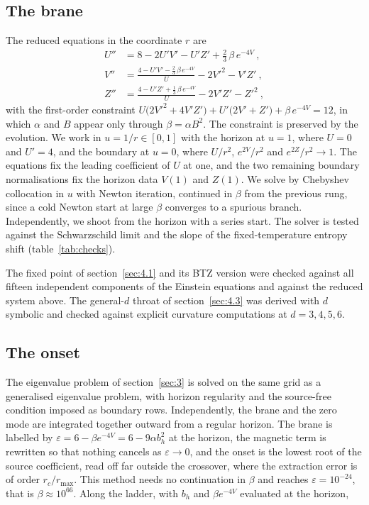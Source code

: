 \subsection{The brane}
\label{app:numerics-brane}

The reduced equations in the coordinate $r$ are
\begin{equation}
\begin{aligned}
U'' &= 8 - 2U'V' - U'Z' + \tfrac23\,\beta\,e^{-4V}~,\\
V'' &= \frac{4 - U'V' - \tfrac23\,\beta\,e^{-4V}}{U} - 2V'^2 - V'Z'~,\\
Z'' &= \frac{4 - U'Z' + \tfrac13\,\beta\,e^{-4V}}{U} - 2V'Z' - Z'^2~,
\end{aligned}
\end{equation}
with the first-order constraint
$U\big(2V'^2 + 4V'Z'\big) + U'\big(2V' + Z'\big) + \beta\,e^{-4V} = 12$, in
which $\alpha$ and $B$ appear only through $\beta = \alpha B^2$. The
constraint is preserved by the evolution. We work in $u = 1/r \in [0, 1]$
with the horizon at $u = 1$, where $U = 0$ and $U' = 4$, and the boundary
at $u = 0$, where $U/r^2$, $e^{2V}/r^2$ and $e^{2Z}/r^2 \to 1$. The equations
fix the leading coefficient of $U$ at one, and the two remaining boundary
normalisations fix the horizon data $V(1)$ and $Z(1)$. We solve by
Chebyshev collocation in $u$ with Newton iteration, continued in $\beta$
from the previous rung, since a cold Newton start at large $\beta$
converges to a spurious branch. Independently, we shoot from the horizon
with a series start. The solver is tested against the Schwarzschild limit
and the slope of the fixed-temperature entropy shift (table~\ref{tab:checks}).

The fixed point of section~\ref{sec:4.1} and its BTZ version were checked
against all fifteen independent components of the Einstein equations and
against the reduced system above. The general-$d$ throat of
section~\ref{sec:4.3} was derived with $d$ symbolic and checked against
explicit curvature computations at $d = 3, 4, 5, 6$.

\subsection{The onset}
\label{app:numerics-onset}

The eigenvalue problem of section~\ref{sec:3} is solved on the same grid as
a generalised eigenvalue problem, with horizon regularity and the
source-free condition imposed as boundary rows. Independently,
the brane and the zero mode are integrated together outward from a regular
horizon. The brane is labelled by
$\varepsilon = 6 - \beta e^{-4V} = 6 - 9\alpha b_h^2$ at the horizon, the
magnetic term is rewritten so that nothing cancels as
$\varepsilon \to 0$, and the onset is the lowest root of the source
coefficient, read off far outside the crossover, where the extraction error
is of order $r_c/r_{\max}$. This method needs no continuation in $\beta$
and reaches $\varepsilon = 10^{-24}$, that is $\beta \approx 10^{66}$. Along the ladder, with $b_h$ and $\beta e^{-4V}$ evaluated at the
horizon,

